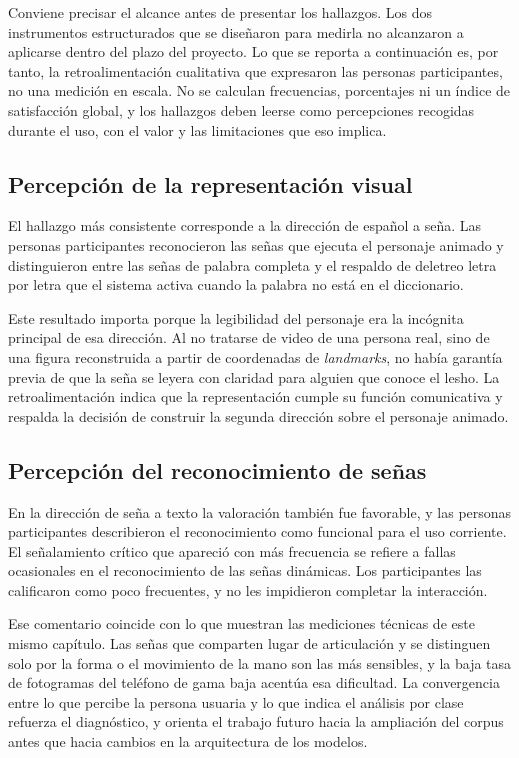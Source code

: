 Conviene precisar el alcance antes de presentar los hallazgos. Los dos instrumentos estructurados que se diseñaron para medirla no alcanzaron a aplicarse dentro del plazo del proyecto. Lo que se reporta a continuación es, por tanto, la retroalimentación cualitativa que expresaron las personas participantes, no una medición en escala. No se calculan frecuencias, porcentajes ni un índice de satisfacción global, y los hallazgos deben leerse como percepciones recogidas durante el uso, con el valor y las limitaciones que eso implica.

\subsection{Percepción de la representación visual}

El hallazgo más consistente corresponde a la dirección de español a seña. Las personas participantes reconocieron las señas que ejecuta el personaje animado y distinguieron entre las señas de palabra completa y el respaldo de deletreo letra por letra que el sistema activa cuando la palabra no está en el diccionario.

Este resultado importa porque la legibilidad del personaje era la incógnita principal de esa dirección. Al no tratarse de video de una persona real, sino de una figura reconstruida a partir de coordenadas de \textit{landmarks}, no había garantía previa de que la seña se leyera con claridad para alguien que conoce el \Acrshort{lesho}. La retroalimentación indica que la representación cumple su función comunicativa y respalda la decisión de construir la segunda dirección sobre el personaje animado.

\subsection{Percepción del reconocimiento de señas}

En la dirección de seña a texto la valoración también fue favorable, y las personas participantes describieron el reconocimiento como funcional para el uso corriente. El señalamiento crítico que apareció con más frecuencia se refiere a fallas ocasionales en el reconocimiento de las señas dinámicas. Los participantes las calificaron como poco frecuentes, y no les impidieron completar la interacción.

Ese comentario coincide con lo que muestran las mediciones técnicas de este mismo capítulo. Las señas que comparten lugar de articulación y se distinguen solo por la forma o el movimiento de la mano son las más sensibles, y la baja tasa de fotogramas del teléfono de gama baja acentúa esa dificultad. La convergencia entre lo que percibe la persona usuaria y lo que indica el análisis por clase refuerza el diagnóstico, y orienta el trabajo futuro hacia la ampliación del corpus antes que hacia cambios en la arquitectura de los modelos.

